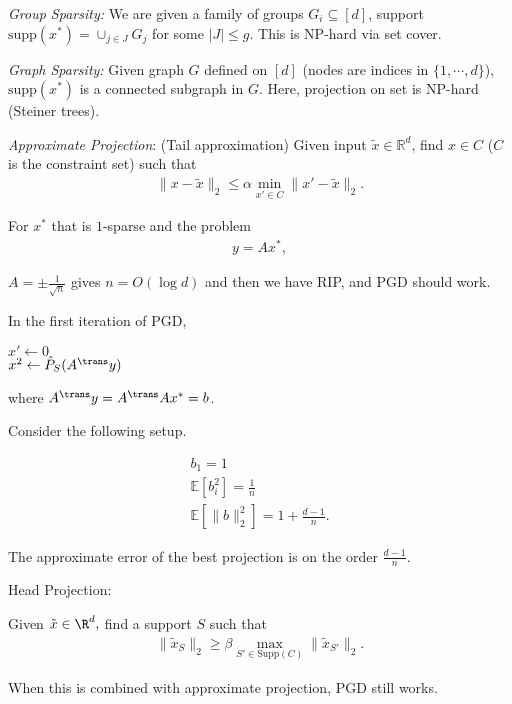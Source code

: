 \begin{definition}
\emph{Group Sparsity:}
We are given a family of groups $G_i \subseteq [d]$, support $\text{supp}(x^*) = \cup_{j \in J} G_j$ for some $|J| \leq g.$ This is NP-hard via set cover. 
\end{definition}

\begin{definition}
\emph{Graph Sparsity:}
Given graph $G$ defined on $[d]$ (nodes are indices in $\{ 1, \cdots, d\}$), $\text{supp}(x^*)$ is a connected subgraph in $G$. Here, projection on set is NP-hard (Steiner trees). 
\end{definition}

\begin{definition}
\emph{Approximate Projection}:
(Tail approximation) Given input $\tilde{x} \in \mathbb{R}^d$, find $x \in C$ ($C$ is the constraint set) such that 
\begin{align*}
\|x - \tilde{x} \|_2 \leq \alpha \min_{x' \in C} \| x'- \tilde{x} \|_2. 
\end{align*}
\end{definition}

For $x^*$ that is $1$-sparse and the problem
\begin{align*}
y = Ax^*,
\end{align*}

$A = \pm \frac{1}{\sqrt{n}}$ gives $n= O(\log d)$ and then we have RIP, and PGD should work. 

In the first iteration of PGD, 
\begin{center}
$x' \leftarrow 0$ \\
$x^2 \leftarrow \hat{P}_S(A^{\trans} y)$
\end{center}

where $A^{\trans} y = A^{\trans} A x^* = b$.

Consider the following setup. 

\begin{align*}
b_1 = 1 \\
\mathbb{E}[b_i^2] = \frac{1}{n} \\
\mathbb{E}[ \|b \|_2^2] = 1 + \frac{d-1}{n}.
\end{align*}


The approximate error of the best projection is on the order $\frac{d-1}{n}$.

\begin{definition}
Head Projection:

Given $\tilde{x} \in \R^d,$ find a support $S$ such that
\begin{align}
\| \tilde{x}_S \|_2 \geq \beta \max_{S' \in \text{Supp}(C)} \| \tilde{x}_{S'} \|_2.
\end{align}
\end{definition}

When this is combined with approximate projection, PGD still works.

